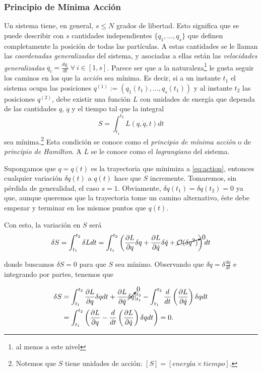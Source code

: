 \subsubsection{Principio de Mínima Acción}
\label{sec:least_action}

Un sistema tiene, en general, $s \leq N$ grados de libertad. Esto significa que se puede describir con $s$ cantidades independientes $\lbrace q_1, \ldots, q_s \rbrace$ que definen completamente la posición de todas las partículas. A estas cantidades se le llaman las \textit{coordenadas generalizadas} del sistema, y asociadas a ellas están las \textit{velocidades generalizadas} $\dot{q_i} = \frac{dq_i}{dt} \  \forall \ i \in [1,s]$. Parece ser que a la naturaleza\footnote{al menos a este nivel} le gusta seguir los caminos en los que la \textit{acción} sea mínima. Es decir, si a un instante $t_1$ el sistema ocupa las posiciones $q^{(1)} := (q_1(t_1), \ldots, q_s(t_1))$ y al instante $t_2$ las posiciones $q^{(2)}$,  debe existir una función $L$ con unidades de energía que dependa de las cantidades $q$, $\dot{q}$ y el tiempo tal que la integral 
\begin{equation}
 S = \int_{t_1}^{t_2} L(q,\dot{q},t) dt
 \label{eq:action}
\end{equation}
sea mínima.\footnote{Notemos que $S$ tiene unidades de acción: $[ S ] = [energía \times tiempo]$.} Esta condición se conoce como el \textit{principio de mínima acción} o de \textit{principio de Hamilton}. A $L$ se le conoce como el \textit{lagrangiano} del sistema.

Supongamos que $q = q(t)$ es la trayectoria que minimiza a \ref{eq:action}, entonces cualquier variación $\delta q(t)$ a $q(t)$ hace que $S$ incremente. Tomaremos, sin pérdida de generalidad, el caso $s = 1$. Obviamente, $\delta q(t_1) = \delta q(t_2) = 0$ ya que, aunque queremos que la trayectoria tome un camino alternativo, éste debe empezar y terminar en los mismos puntos que $q(t)$. 

Con esto, la variación en $S$ será 
\begin{align*}
 \delta S = \int_{t_1}^{t_2} \delta L dt = \int_{t_1}^{t_2} \left( \frac{\partial L}{\partial q} \delta q + \frac{\partial L}{\partial  \dot{q} } \delta \dot{q} + \cancelto{0}{\mathcal{O}(\delta q^2)} \right) dt
\end{align*}

donde buscamos $\delta S = 0$ para que $S$ sea mínimo. Observando que $\delta \dot{q} = \delta \frac{dq}{dt}$ e integrando por partes, tenemos que 

\begin{align*}
 \delta S &= \int_{t_1}^{t_2} \frac{\partial L}{\partial q} \delta q dt + \frac{\partial L}{\partial \dot{q}} \cancelto{0}{\delta q} \rvert_{t_1}^{t_2} - \int_{t_1}^{t_2} \frac{d}{dt} \left( \frac{\partial L}{\partial \dot{q}} \right) \delta q dt\\ 
 &= \int_{t_1}^{t_2} \left( \frac{\partial L}{\partial q} - \frac{d}{dt} \left( \frac{\partial L}{\partial  \dot{q} } \right) \delta q dt \right) = 0.
\end{align*}

